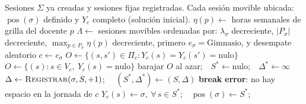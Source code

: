\documentclass{article}
\begin{document}
\begin{algorithm}[H]
\caption{$\textsc{ConstrucciónVoraz}()$}
\label{alg:voraz}
\begin{algorithmic}[1]
\Require Sesiones $\Sigma$ ya creadas y sesiones fijas registradas.
\Ensure Cada sesión movible ubicada: $\operatorname{pos}(\sigma)$ definido y $Y_c$ completo (solución inicial).
\State $\eta(p) \gets$ horas semanales de grilla del docente $p$ 
\State $\Lambda \gets$ sesiones movibles ordenadas por: 
\Statex \hspace{\algorithmicindent} $\lambda_\sigma$ decreciente, $|P_\sigma|$ decreciente, $\max_{p \in P_\sigma} \eta(p)$ decreciente,
        primero $e_\sigma = \text{Gimnasio}$, y desempate aleatorio
    \State $c \gets c_\sigma$
        \State $O \gets \{(s, s') \in \Pi_c : Y_c(s) = Y_c(s') = \text{nulo}\}$ 
    \Else
        \State $O \gets \{(s) : s \in V_c,\ Y_c(s) = \text{nulo}\}$ 
    \EndIf
    \State barajar $O$ al azar;\ \ $S^* \gets \text{nulo}$;\ \ $\Delta^* \gets \infty$
        \State $\Delta \gets \Call{Registrar}{\sigma, S, +1}$;\ \  
        \If{$\Delta < \Delta^*$}
            \State $(S^*, \Delta^*) \gets (S, \Delta)$
                \State \textbf{break} 
            \EndIf
        \EndIf
    \EndFor
        \State \textbf{error}: no hay espacio en la jornada de $c$
    \EndIf
    \State $Y_c(s) \gets \sigma,\ \forall\, s \in S^*$;\ \ $\operatorname{pos}(\sigma) \gets S^*$;\ \ 
\EndFor
\end{algorithmic}
\end{algorithm}
\end{document}
